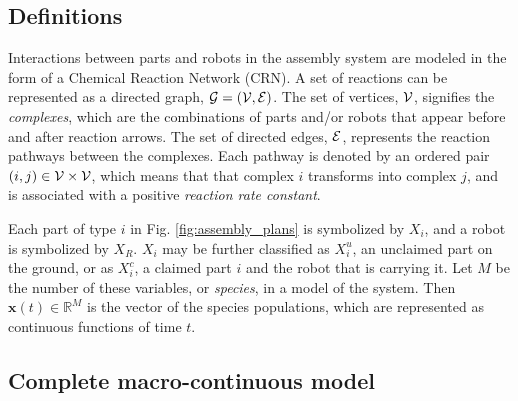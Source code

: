\subsection{Definitions}
Interactions between parts and robots in the assembly system are
modeled in the form of a Chemical Reaction Network (CRN).  A set of
reactions can be represented as a directed graph, ${\cal G} = ({\cal
V}, {\cal E})$. The set of vertices, ${\cal V}$, signifies the {\it
complexes}, which are the combinations of parts and/or robots that
appear before and after reaction arrows. The set of directed edges,
${\cal E}$, represents the reaction pathways between the complexes.
Each pathway is denoted by an ordered pair $(i,j) \in {\cal V}
\times {\cal V}$, which means that that complex $i$ transforms into
complex $j$, and is associated with a positive {\it reaction rate
constant}.

Each part of type $i$ in Fig. \ref{fig:assembly_plans} is symbolized
by $X_i$, and a robot is symbolized by $X_R$.  $X_i$ may be further
classified as $X_i^u$, an unclaimed part on the ground, or as
$X_i^c$, a claimed part $i$ and the robot that is carrying it. Let
$M$ be the number of these variables, or {\it species}, in a model
of the system. Then $\mathbf{x}(t) \in \mathbb{R}^M$ is the vector
of the species populations, which are represented as continuous
functions of time $t$.

\subsection{Complete macro-continuous model} %
\label{sub:complete_macro_continuous_model}


